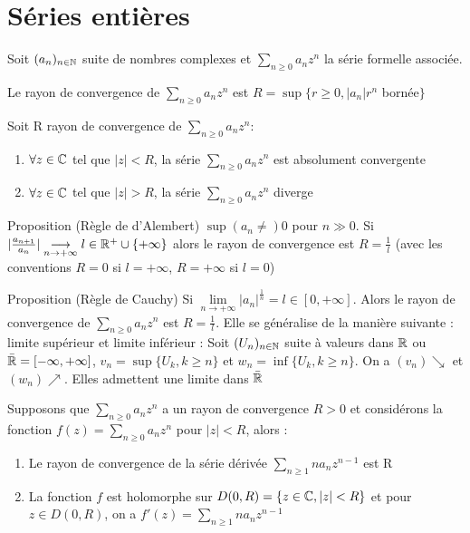 \documentclass[]{report}
\begin{document}
\section{Séries entières}

Soit $(a_n)_{n\in\mathbb{N}}$ suite de nombres complexes et $\sum_{n\ge0}a_nz^n$ la série formelle associée.

\begin{df}{}{}
    Le rayon de convergence de $\sum_{n\ge0}a_n z^n$ est $R=\sup \{r\ge0,|a_n|r^n $ bornée$\}$
\end{df}

\begin{tm}{}{}
    Soit R rayon de convergence de $\sum_{n\ge0}a_n z^n$:
    \begin{enumerate}
        \item $\forall z \in \mathbb{C} $ tel que $|z|<R$, la série $\sum_{n\ge0}a_nz^n$ est absolument convergente
        \item $\forall z\in\mathbb{C}$ tel que $|z|>R$, la série $\sum_{n\ge0}a_nz^n$ diverge
    \end{enumerate}
\end{tm}

\begin{prop}{Proposition (Règle de d'Alembert)}{}
    $\sup (a_n \ne) 0$ pour $n \gg0$. Si $|\frac{a_{n+1}}{a_n}| \underset{n\to +\infty}{\longrightarrow}l \in \mathbb{R}^+\cup\{+\infty\}$ alors le rayon de convergence est $R=\frac{1}{l}$ (avec les conventions $R=0$ si $l=+\infty$, $R=+\infty$ si $l=0$)
\end{prop}

\begin{prop}{Proposition (Règle de Cauchy)}{}
    Si $\lim\limits_{n \rightarrow +\infty}|a_n|^{\frac{1}{n}}=l \in [0,+\infty]$. Alors le rayon de convergence de $\sum_{n\ge0}a_nz^n$ est $R=\frac{1}{l}$. Elle se généralise de la manière suivante :\\
    limite supérieur et limite inférieur : Soit $(U_n)_{n\in\mathbb{N}}$ suite à valeurs dans $\mathbb{R}$ ou $\bar{\mathbb{R}}=[-\infty,+\infty]$, $v_n=\sup \{U_k,k\ge n\}$ et $w_n=\inf \{U_k, k\ge n\}$. On a $(v_n) \searrow$ et $(w_n) \nearrow$. Elles admettent une limite dans $\bar{\mathbb{R}}$
\end{prop}

\begin{prop}{}{}
    Supposons que $\sum_{n\ge0}a_nz^n$ a un rayon de convergence $R>0$ et considérons la fonction $f(z)=\sum_{n\ge0}a_nz^n$ pour $|z|<R$, alors :
    \begin{enumerate}
        \item Le rayon de convergence de la série dérivée $\sum_{n\ge1}na_nz^{n-1}$ est R
        \item La fonction $f$ est holomorphe sur $D(0,R)=\{z\in\mathbb{C}, |z|<R\}$ et pour $z \in D(0,R)$, on a $f'(z)=\sum_{n\ge1}na_nz^{n-1}$
    \end{enumerate}
\end{prop}
\end{document}
